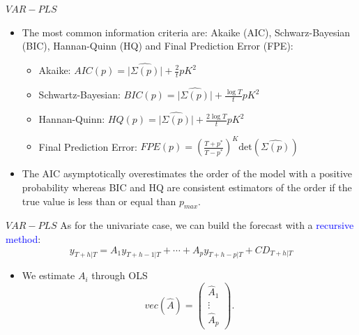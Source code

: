 \documentclass{beamer}
\newcommand{\?}{?`}
\begin{document}
\begin{frame}{$VAR-PLS$}
  \begin{itemize}
  \item The most common information criteria are: Akaike (AIC), Schwarz-Bayesian (BIC), Hannan-Quinn (HQ) and Final Prediction Error (FPE):
    \begin{itemize}
    \item Akaike: $AIC(p)=\vert \hat{\Sigma(p)} \vert +
      \frac{2}{t}pK^2$
    \item Schwartz-Bayesian: $BIC(p)=\vert \hat{\Sigma(p)} \vert +
      \frac{\log T}{t}pK^2$
    \item Hannan-Quinn: $HQ(p)=\vert \hat{\Sigma(p)} \vert +
      \frac{2\log T}{t}pK^2$
    \item Final Prediction Error:
      $FPE(p)=\left(\frac{T+p^{*}}{T-p^{*}}\right)^K
      \text{det}(\hat{\Sigma(p)})$
    \end{itemize}
  \item The AIC asymptotically overestimates the order of the model with a positive
  probability whereas BIC and HQ are consistent estimators of the order if the true value is less than or equal than $p_{max}$.
  \end{itemize}
\end{frame}

\begin{frame}{$VAR-PLS$}
  As for the univariate case, we can build the forecast with a \textcolor{blue}{recursive method}:
    \begin{displaymath}
    y_{T+h|T}=A_1y_{T+h-1|T} + \cdots + A_py_{T+h-p|T} + CD_{T+h|T}
  \end{displaymath}
  \begin{itemize}
  \item We estimate $A_i$ through OLS
    \begin{displaymath}
        vec(\hat{A})=\left(
        \begin{array}{c}
          \hat{A}_1 \\
          \vdots \\
          \hat{A}_p
        \end{array}
        \right).
    \end{displaymath}
  \end{itemize}
\end{frame}
\end{document}

